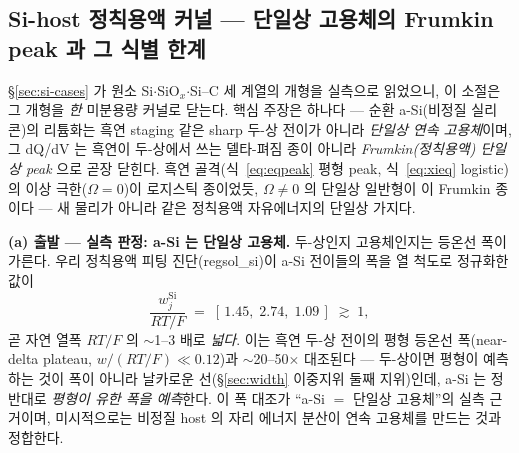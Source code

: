 \subsection{Si-host 정칙용액 커널 --- 단일상 고용체의 Frumkin peak 과 그 식별 한계}\label{ssec:si-fr}
\S\ref{sec:si-cases} 가 원소 Si$\cdot$SiO$_x$$\cdot$Si--C 세 계열의 개형을 실측으로 읽었으니, 이 소절은 그
개형을 \emph{한} 미분용량 커널로 닫는다. 핵심 주장은 하나다 --- 순환 a-Si(비정질 실리콘)의 리튬화는 흑연 staging 같은
sharp 두-상 전이가 아니라 \emph{단일상 연속 고용체}이며, 그 dQ/dV 는 흑연이 두-상에서 쓰는 델타-펴짐 종이 아니라
\emph{Frumkin(정칙용액) 단일상 peak} 으로 곧장 닫힌다. 흑연 골격(식~\eqref{eq:eqpeak} 평형 peak,
식~\eqref{eq:xieq} logistic)의 이상 극한($\Omega{=}0$)이 로지스틱 종이었듯, $\Omega\ne0$ 의 단일상 일반형이
이 Frumkin 종이다 --- 새 물리가 아니라 같은 정칙용액 자유에너지의 단일상 가지다.

\textbf{(a) 출발 --- 실측 판정: a-Si 는 단일상 고용체.} 두-상인지 고용체인지는 등온선 폭이 가른다. 우리 정칙용액
피팅 진단(regsol\_si)이 a-Si 전이들의 폭을 열 척도로 정규화한 값이
\begin{equation}
\frac{w_j^{\mathrm{Si}}}{RT/F}\;=\;[\,1.45,\;2.74,\;1.09\,]\;\gtrsim\;1,
\label{eq:sifr-width}
\end{equation}
곧 자연 열폭 $RT/F$ 의 $\sim$1--3 배로 \emph{넓다}. 이는 흑연 두-상 전이의 평형 등온선 폭(near-delta plateau,
$w/(RT/F)\!\ll\!0.12$)과 $\sim$20--50$\times$ 대조된다 --- 두-상이면 평형이 예측하는 것이 폭이 아니라 날카로운
선(\S\ref{sec:width} 이중지위 둘째 지위)인데, a-Si 는 정반대로 \emph{평형이 유한 폭을 예측}한다. 이 폭 대조가
``a-Si $=$ 단일상 고용체''의 실측 근거이며, 미시적으로는 비정질 host 의 자리 에너지 분산이 연속 고용체를 만드는
것과 정합한다\cite{chevrier_dahn2009,artrith2018}.

